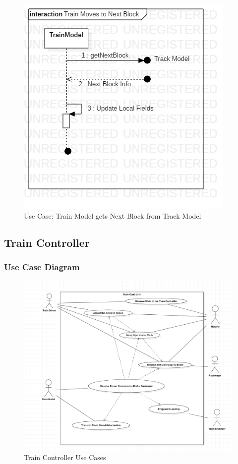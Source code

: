 \documentclass{article}
\begin{document}
    \begin{figure}[H]
        \centering
        \includegraphics[width=\textwidth]{./TrainModel/NextBlock.png}
        \caption{Use Case: Train Model gets Next Block from Track Model}
        \label{fig:Train Model Next Block}
    \end{figure}
    

    \subsection{Train Controller}
    \subsubsection{Use Case Diagram}
    \begin{figure}[H]
        \centering
        \includegraphics[width=\textwidth]{./UseCaseDiagrams/TNCUCD2.png}
        \caption{Train Controller Use Cases}
        \label{fig:Train Controler Use Cases}
    \end{figure}
\end{document}
